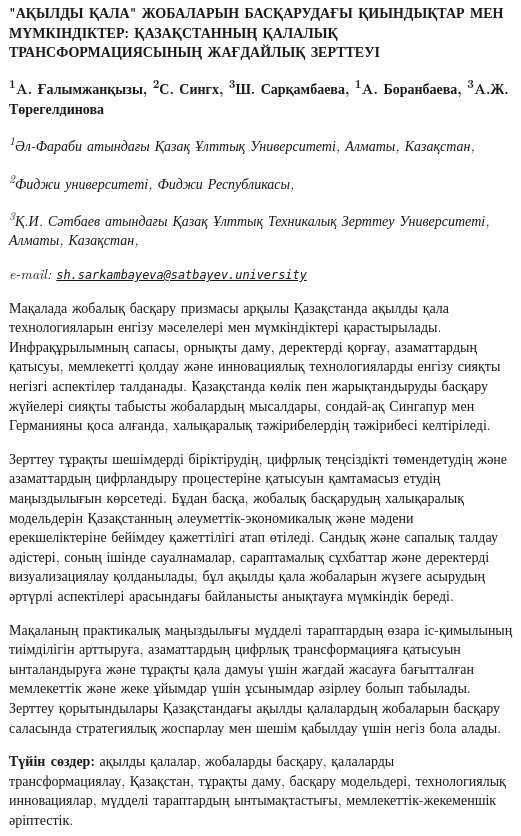 {\bfseries "АҚЫЛДЫ ҚАЛА" ЖОБАЛАРЫН БАСҚАРУДАҒЫ ҚИЫНДЫҚТАР МЕН МҮМКІНДІКТЕР:
ҚАЗАҚСТАННЫҢ ҚАЛАЛЫҚ ТРАНСФОРМАЦИЯСЫНЫҢ ЖАҒДАЙЛЫҚ ЗЕРТТЕУІ}

{\bfseries \textsuperscript{1}A. Ғалымжанқызы, \textsuperscript{2}С. Сингх,
\textsuperscript{3}Ш. Сарқамбаева\textsuperscript{\envelope },
\textsuperscript{1}A. Боранбаева, \textsuperscript{3}A.Ж. Төрегелдинова}

\emph{\textsuperscript{1}Әл-Фараби атындағы Қазақ Ұлттық Университеті,
Алматы, Казақстан,}

\emph{\textsuperscript{2}Фиджи университеті, Фиджи Республикасы,}

\emph{\textsuperscript{3}Қ.И. Сәтбаев атындағы Қазақ Ұлттық Техникалық
Зерттеу Университеті, Алматы, Казақстан,}

\emph{e-mail:
\href{mailto:sh.sarkambayeva@satbayev.university}{\nolinkurl{sh.sarkambayeva@satbayev.university}}}

Мақалада жобалық басқару призмасы арқылы Қазақстанда ақылды қала
технологияларын енгізу мәселелері мен мүмкіндіктері қарастырылады.
Инфрақұрылымның сапасы, орнықты даму, деректерді қорғау, азаматтардың
қатысуы, мемлекетті қолдау және инновациялық технологияларды енгізу
сияқты негізгі аспектілер талданады. Қазақстанда көлік пен
жарықтандыруды басқару жүйелері сияқты табысты жобалардың мысалдары,
сондай-ақ Сингапур мен Германияны қоса алғанда, халықаралық
тәжірибелердің тәжірибесі келтіріледі.

Зерттеу тұрақты шешімдерді біріктірудің, цифрлық теңсіздікті
төмендетудің және азаматтардың цифрландыру процестеріне қатысуын
қамтамасыз етудің маңыздылығын көрсетеді. Бұдан басқа, жобалық
басқарудың халықаралық модельдерін Қазақстанның әлеуметтік-экономикалық
және мәдени ерекшеліктеріне бейімдеу қажеттілігі атап өтіледі. Сандық
және сапалық талдау әдістері, соның ішінде сауалнамалар, сараптамалық
сұхбаттар және деректерді визуализациялау қолданылады, бұл ақылды қала
жобаларын жүзеге асырудың әртүрлі аспектілері арасындағы байланысты
анықтауға мүмкіндік береді.

Мақаланың практикалық маңыздылығы мүдделі тараптардың өзара іс-қимылының
тиімділігін арттыруға, азаматтардың цифрлық трансформацияға қатысуын
ынталандыруға және тұрақты қала дамуы үшін жағдай жасауға бағытталған
мемлекеттік және жеке ұйымдар үшін ұсынымдар әзірлеу болып табылады.
Зерттеу қорытындылары Қазақстандағы ақылды қалалардың жобаларын басқару
саласында стратегиялық жоспарлау мен шешім қабылдау үшін негіз бола
алады.

{\bfseries Түйін сөздер:} ақылды қалалар, жобаларды басқару, қалаларды
трансформациялау, Қазақстан, тұрақты даму, басқару модельдері,
технологиялық инновациялар, мүдделі тараптардың ынтымақтастығы,
мемлекеттік-жекеменшік әріптестік.

